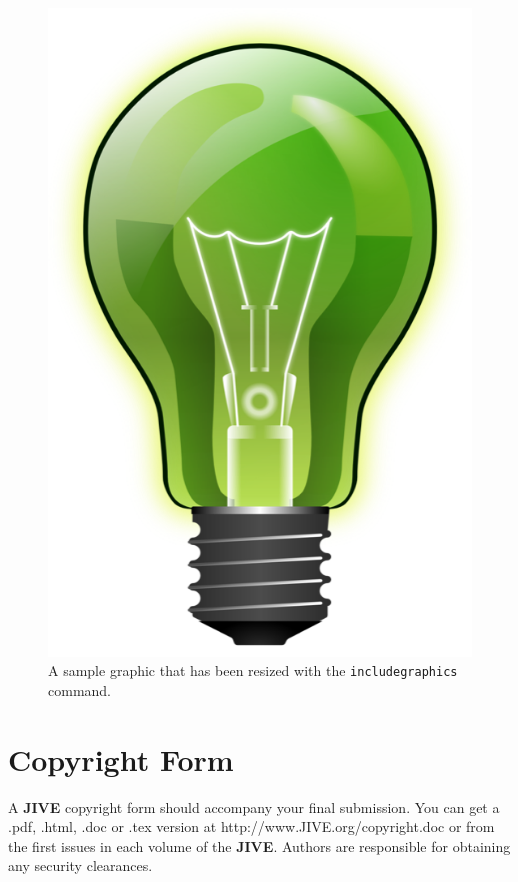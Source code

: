 \documentclass{jiveArticle}
\begin{document}
\begin{figure}
	\centering
	\includegraphics[scale=0.3]{images/green_light_bulb}
	\caption{A sample graphic
		that has been resized with the \texttt{includegraphics} command.}
\end{figure}

\section{Copyright Form}
A \textbf{JIVE} copyright form should accompany your final submission. You can get a .pdf, .html, .doc or .tex version at http://www.JIVE.org/copyright.doc or from the first issues in each volume of the \textbf{JIVE}. Authors are responsible for obtaining any security clearances.
\end{document}
